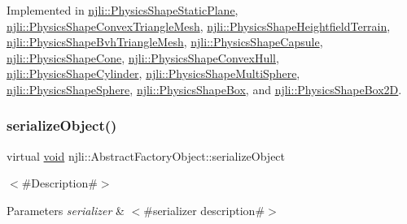 Implemented in \mbox{\hyperlink{classnjli_1_1_physics_shape_static_plane_a95e3b4c85db36869d5cb85487b88cbad}{njli\+::\+Physics\+Shape\+Static\+Plane}}, \mbox{\hyperlink{classnjli_1_1_physics_shape_convex_triangle_mesh_a4a009f76809d15cbcd4f4e6f8353f1c4}{njli\+::\+Physics\+Shape\+Convex\+Triangle\+Mesh}}, \mbox{\hyperlink{classnjli_1_1_physics_shape_heightfield_terrain_a445d0515891fd81edc19049ee5a8c46f}{njli\+::\+Physics\+Shape\+Heightfield\+Terrain}}, \mbox{\hyperlink{classnjli_1_1_physics_shape_bvh_triangle_mesh_a559d30e350c441eeeceac724a635c9ad}{njli\+::\+Physics\+Shape\+Bvh\+Triangle\+Mesh}}, \mbox{\hyperlink{classnjli_1_1_physics_shape_capsule_a48a70d364b231ba98de91dd53af33ed3}{njli\+::\+Physics\+Shape\+Capsule}}, \mbox{\hyperlink{classnjli_1_1_physics_shape_cone_a8697c559d914b92d57671d4204e336da}{njli\+::\+Physics\+Shape\+Cone}}, \mbox{\hyperlink{classnjli_1_1_physics_shape_convex_hull_a2243032bcc3590a97f3ac40f976b3703}{njli\+::\+Physics\+Shape\+Convex\+Hull}}, \mbox{\hyperlink{classnjli_1_1_physics_shape_cylinder_ad7ec0be0f27ab4b0248fa1231491fd20}{njli\+::\+Physics\+Shape\+Cylinder}}, \mbox{\hyperlink{classnjli_1_1_physics_shape_multi_sphere_a11acca92dfad6bbfc36017267362f128}{njli\+::\+Physics\+Shape\+Multi\+Sphere}}, \mbox{\hyperlink{classnjli_1_1_physics_shape_sphere_a945c46bbfca818c8c9570124896cc8dc}{njli\+::\+Physics\+Shape\+Sphere}}, \mbox{\hyperlink{classnjli_1_1_physics_shape_box_a3c8a170c8a0a3bb3184886d9657df74c}{njli\+::\+Physics\+Shape\+Box}}, and \mbox{\hyperlink{classnjli_1_1_physics_shape_box2_d_ad3f806a86d7db579cd7d43f4e8f41ace}{njli\+::\+Physics\+Shape\+Box2D}}.

\mbox{\label{classnjli_1_1_physics_shape_a4fc4bcd9d1930911474210c047372fc0}} 
\subsubsection{\texorpdfstring{serialize\+Object()}{serializeObject()}}
{\footnotesize\ttfamily virtual \mbox{\hyperlink{_thread_8h_af1e856da2e658414cb2456cb6f7ebc66}{void}} njli\+::\+Abstract\+Factory\+Object\+::serialize\+Object}

$<$\#\+Description\#$>$


\begin{DoxyParams}{Parameters}
{\em serializer} & $<$\#serializer description\#$>$ \\
\hline
\end{DoxyParams}
\mbox{\label{classnjli_1_1_physics_shape_a441e82a42f3b588a409c3b6c41288abd}} 
